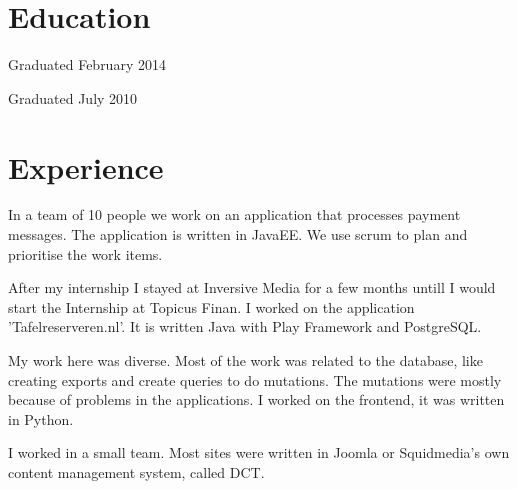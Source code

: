 \documentclass[]{deedy-resume-openfont}
\begin{document}
\begin{minipage}[t]{0.66\textwidth} 
	

\section{Education} 

Graduated February 2014 
\sectionsep

Graduated July 2010 
\sectionsep


\section{Experience}

In a team of 10 people we work on an application that processes payment messages. 
The application is written in JavaEE. 
We use scrum to plan and prioritise the work items.
\sectionsep

After my internship I stayed at Inversive Media for a few months untill I would start the Internship at Topicus Finan.
I worked on the application 'Tafelreserveren.nl'. It is written Java with Play Framework and PostgreSQL.
\sectionsep

My work here was diverse. 
Most of the work was related to the database, like creating exports and create queries to do mutations.
The mutations were mostly because of problems in the applications.
I worked on the frontend, it was written in Python.
\sectionsep

I worked in a small team.
Most sites were written in Joomla or Squidmedia's own content management system, called DCT.
\sectionsep


\end{minipage}
\end{document}
